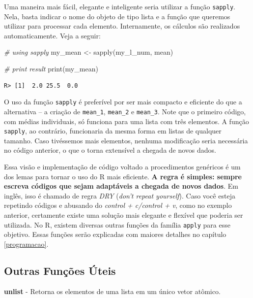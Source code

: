 \documentclass[
  11pt,
]{book}
\newenvironment{Shaded}{\begin{snugshade}}{\end{snugshade}}
\newcommand{\CommentTok}[1]{\textcolor[rgb]{0.37,0.37,0.37}{\textit{#1}}}
\newcommand{\FunctionTok}[1]{\textcolor[rgb]{0,0,0}{#1}}
\newcommand{\NormalTok}[1]{#1}
\newcommand{\OtherTok}[1]{\textcolor[rgb]{0.37,0.37,0.37}{#1}}
\begin{document}
Uma maneira mais fácil, elegante e inteligente seria utilizar a função \texttt{sapply}. Nela, basta indicar o nome do objeto de tipo lista e a função que queremos utilizar para processar cada elemento. Internamente, os cálculos são realizados automaticamente. Veja a seguir:

\begin{Shaded}
\begin{Highlighting}[]
\CommentTok{\# using sapply}
\NormalTok{my\_mean }\OtherTok{\textless{}{-}} \FunctionTok{sapply}\NormalTok{(my\_l\_num, mean)}

\CommentTok{\# print result}
\FunctionTok{print}\NormalTok{(my\_mean)}
\end{Highlighting}
\end{Shaded}

\begin{verbatim}
R> [1]  2.0 25.5  0.0
\end{verbatim}

O uso da função \texttt{sapply} é preferível por ser mais compacto e eficiente do que a alternativa -- a criação de \texttt{mean\_1}, \texttt{mean\_2} e \texttt{mean\_3}. Note que o primeiro código, com médias individuais, só funciona para uma lista com três elementos. A função \texttt{sapply}, ao contrário, funcionaria da mesma forma em listas de qualquer tamanho. Caso tivéssemos mais elementos, nenhuma modificação seria necessária no código anterior, o que o torna extensível a chegada de novos dados.

Essa visão e implementação de código voltado a procedimentos genéricos é um dos lemas para tornar o uso do R mais eficiente. \textbf{A regra é simples: sempre escreva códigos que sejam adaptáveis a chegada de novos dados}. Em inglês, isso é chamado de regra \emph{DRY} (\emph{don't repeat yourself}). Caso você esteja repetindo códigos e abusando do \emph{control + c/control + v}, como no exemplo anterior, certamente existe uma solução mais elegante e flexível que poderia ser utilizada. No R, existem diversas outras funções da família \texttt{apply} para esse objetivo. Essas funções serão explicadas com maiores detalhes no capítulo \ref{programacao}.

\hypertarget{outras-funuxe7uxf5es-uxfateis-1}{%
\subsection{Outras Funções Úteis}\label{outras-funuxe7uxf5es-uxfateis-1}}

\textbf{unlist} - Retorna os elementos de uma lista em um único vetor atômico.
\end{document}
